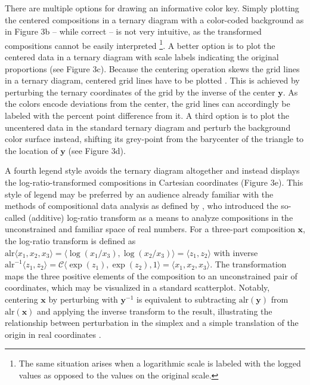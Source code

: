 \documentclass[10pt,twoside,reqno]{article}
\let\oldfootnote\footnote
\renewcommand\footnote[1]{%
\oldfootnote{\hspace{0.6mm}#1}}
\begin{document}
There are multiple options for drawing an informative color key. Simply
plotting the centered compositions in a ternary diagram with a
color-coded background as in Figure 3b -- while correct -- is not very
intuitive, as the transformed compositions cannot be easily
interpreted\footnote{The same situation arises when a logarithmic scale
  is labeled with the logged values as opposed to the values on the
  original scale.}. A better option is to plot the centered data in a
ternary diagram with scale labels indicating the original proportions
(see Figure 3c). Because the centering operation skews the grid lines in
a ternary diagram, centered grid lines have to be plotted
\citep{VonEynatten2002}. This is achieved by perturbing the ternary
coordinates of the grid by the inverse of the center \(\mathbf{y}\). As
the colors encode deviations from the center, the grid lines can
accordingly be labeled with the percent point difference from it. A
third option is to plot the uncentered data in the standard ternary
diagram and perturb the background color surface instead, shifting its
grey-point from the barycenter of the triangle to the location of
\(\mathbf{y}\) (see Figure 3d).

A fourth legend style avoids the ternary diagram altogether and instead
displays the log-ratio-transformed compositions in Cartesian coordinates
(Figure 3e). This style of legend may be preferred by an audience
already familiar with the methods of compositional data analysis as
defined by \citet{Aitchison1982}, who introduced the so-called
(additive) log-ratio transform as a means to analyze compositions in the
unconstrained and familiar space of real numbers. For a three-part
composition \(\mathbf{x}\), the log-ratio transform is defined as
\(\text{alr} \langle x_1, x_2, x_3 \rangle = \langle \log (x_1/x_3), \log (x_2/x_3) \rangle = \langle z_1,z_2 \rangle\)
with inverse
\(\text{alr}^{-1}\langle z_1,z_2 \rangle=\mathcal{C}\langle \exp(z_1), \exp (z_2), 1 \rangle = \langle x_1, x_2, x_3 \rangle\).
The transformation maps the three positive elements of the composition
to an unconstrained pair of coordinates, which may be visualized in a
standard scatterplot. Notably, centering \(\mathbf{x}\) by perturbing
with \(\mathbf{y}^{-1}\) is equivalent to subtracting
\(\text{alr}(\mathbf{y})\) from \(\text{alr}(\mathbf{x})\) and applying
the inverse transform to the result, illustrating the relationship
between perturbation in the simplex and a simple translation of the
origin in real coordinates \citep{Aitchison2005a}.
\end{document}
